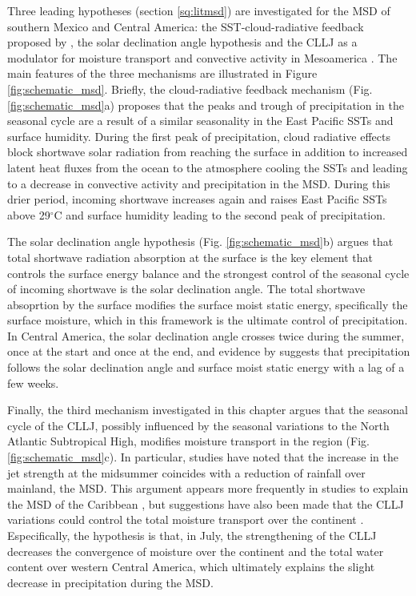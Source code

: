 Three leading hypotheses (section \ref{sq:litmsd}) are investigated for the MSD of southern Mexico and Central America:
the SST-cloud-radiative feedback proposed by \cite{magana1999}, the solar declination angle hypothesis \citep{karnauskas2013} and the CLLJ as a modulator for moisture transport and convective activity in Mesoamerica \citep{herrera2015,zermeno2019}.
The main features of the three mechanisms are illustrated in Figure \ref{fig:schematic_msd}. 
Briefly, the cloud-radiative feedback mechanism (Fig. \ref{fig:schematic_msd}a) proposes that the peaks and trough of precipitation in the seasonal cycle are a result of a similar seasonality in the East Pacific SSTs and surface humidity. 
During the first peak of precipitation, cloud radiative effects block shortwave solar radiation from reaching the surface in addition to increased latent heat fluxes from the ocean to the atmosphere cooling the SSTs and leading to a decrease in convective activity and precipitation in the MSD.
During this drier period, incoming shortwave increases again and raises East Pacific SSTs above 29$^\circ$C and surface humidity leading to the second peak of precipitation. %

The solar declination angle hypothesis (Fig. \ref{fig:schematic_msd}b) argues that total shortwave radiation absorption at the surface is the key element that controls the surface energy balance and the strongest control of the seasonal cycle of incoming shortwave is the solar declination angle. The total shortwave absoprtion by the surface modifies the surface moist static energy, specifically the surface moisture, which in this framework is the ultimate control of precipitation. In Central America, the solar declination angle crosses twice during the summer, once at the start and once at the end, and evidence by \cite{karnauskas2013} suggests that precipitation follows the solar declination angle and surface moist static energy with a lag of a few weeks.

Finally, the third mechanism investigated in this chapter argues that the seasonal cycle of the CLLJ, possibly influenced by the seasonal variations to the North Atlantic Subtropical High, modifies moisture transport in the region (Fig. \ref{fig:schematic_msd}c). In particular, studies have noted that the increase in the jet strength at the midsummer coincides with a reduction of rainfall over mainland, the MSD. This argument appears more frequently in studies to explain the MSD of the Caribbean \citep[e.g.][]{martinez2019}, but suggestions have also been made that the CLLJ variations could control the total moisture transport over the continent \citep{herrera2015}. Especifically, the hypothesis is that, in July,  the strengthening of the CLLJ decreases the convergence of moisture over the continent and the total water content over western Central America, which ultimately explains the slight decrease in precipitation during the MSD.

